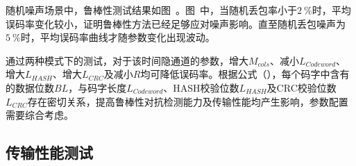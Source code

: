随机噪声场景中，鲁棒性测试结果如图\ 。图\ 中，当随机丢包率小于{$2\ \%$}时，平均误码率变化较小，证明鲁棒性方法已经足够应对噪声影响。直至随机丢包噪声为{$5\ \%$}时，平均误码率曲线才随参数变化出现波动。

通过两种模式下的测试，对于该时间隐通道的参数，增大$M_{cols}$、减小$L_{Codeword}$、增大$L_{HASH}$、增大$L_{CRC}$及减小$R$均可降低误码率。根据公式（），每个码字中含有的数据位数$BL$，与码字长度$L_{Codeword}$、HASH校验位数$L_{HASH}$及CRC校验位数$L_{CRC}$存在密切关系，提高鲁棒性对抗检测能力及传输性能均产生影响，参数配置需要综合考虑。

\subsection{传输性能测试}
\label{chap:hash:result:throughput}

